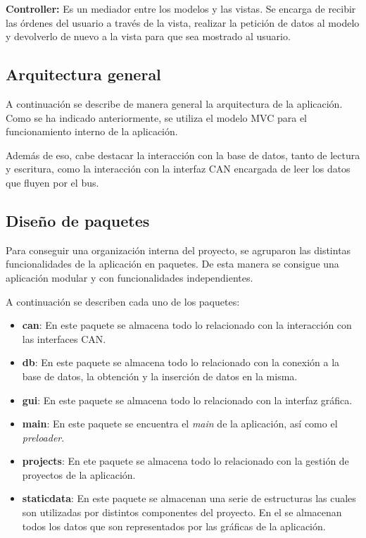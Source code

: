 \textbf{Controller:} Es un mediador entre los modelos y las vistas. Se encarga de recibir las órdenes del usuario a través de la vista, realizar la petición de datos al modelo y devolverlo de nuevo a la vista para que sea mostrado al usuario.

\newpage
\subsection{Arquitectura general}

A continuación se describe de manera general la arquitectura de la aplicación. Como se ha indicado anteriormente, se utiliza el modelo MVC para el funcionamiento interno de la aplicación.

Además de eso, cabe destacar la interacción con la base de datos, tanto de lectura y escritura, como la interacción con la interfaz CAN encargada de leer los datos que fluyen por el bus.


\subsection{Diseño de paquetes}

Para conseguir una organización interna del proyecto, se agruparon las distintas funcionalidades de la aplicación en paquetes. De esta manera se consigue una aplicación modular y con funcionalidades independientes.


A continuación se describen cada uno de los paquetes:

\begin{itemize}
\item
\textbf{can}: En este paquete se almacena todo lo relacionado con la interacción con las interfaces CAN.
\item
\textbf{db}: En este paquete se almacena todo lo relacionado con la conexión a la base de datos, la obtención y la inserción de datos en la misma.
\item
\textbf{gui}: En este paquete se almacena todo lo relacionado con la interfaz gráfica. 
\item
\textbf{main}: En este paquete se encuentra el \emph{main} de la aplicación, así como el \emph{preloader}.
\item
\textbf{projects}: En ete paquete se almacena todo lo relacionado con la gestión de proyectos de la aplicación.
\item
\textbf{staticdata}: En este paquete se almacenan una serie de estructuras las cuales son utilizadas por distintos componentes del proyecto. En el se almacenan todos los datos que son representados por las gráficas de la aplicación.
\end{itemize}

